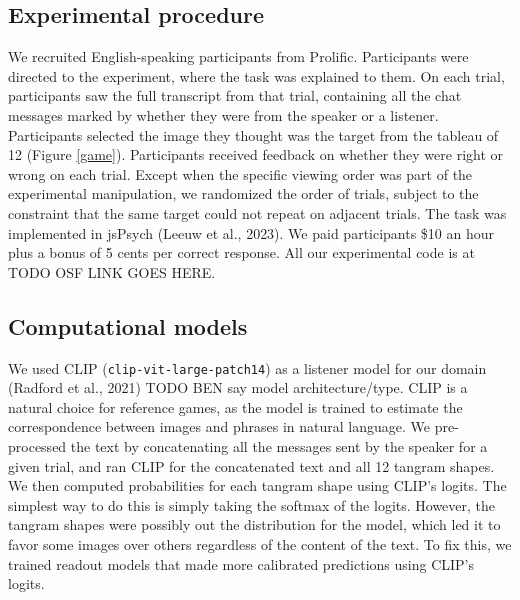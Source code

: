 \documentclass[10pt, letterpaper]{article}
\begin{document}
\subsection{Experimental procedure}\label{experimental-procedure}

We recruited English-speaking participants from Prolific. Participants
were directed to the experiment, where the task was explained to them.
On each trial, participants saw the full transcript from that trial,
containing all the chat messages marked by whether they were from the
speaker or a listener. Participants selected the image they thought was
the target from the tableau of 12 (Figure \ref{game}). Participants
received feedback on whether they were right or wrong on each trial.
Except when the specific viewing order was part of the experimental
manipulation, we randomized the order of trials, subject to the
constraint that the same target could not repeat on adjacent trials. The
task was implemented in jsPsych (Leeuw et al., 2023). We paid
participants \$10 an hour plus a bonus of 5 cents per correct response.
All our experimental code is at TODO OSF LINK GOES HERE.

\subsection{Computational models}\label{computational-models}

We used CLIP (\texttt{clip-vit-large-patch14}) as a listener model for
our domain (Radford et al., 2021) TODO BEN say model architecture/type.
CLIP is a natural choice for reference games, as the model is trained to
estimate the correspondence between images and phrases in natural
language. We pre-processed the text by concatenating all the messages
sent by the speaker for a given trial, and ran CLIP for the concatenated
text and all 12 tangram shapes. We then computed probabilities for each
tangram shape using CLIP's logits. The simplest way to do this is simply
taking the softmax of the logits. However, the tangram shapes were
possibly out the distribution for the model, which led it to favor some
images over others regardless of the content of the text. To fix this,
we trained readout models that made more calibrated predictions using
CLIP's logits.
\end{document}
